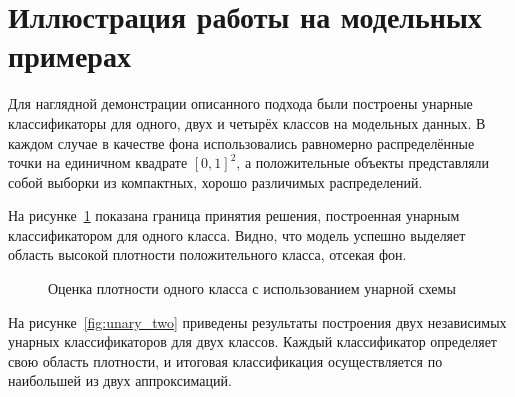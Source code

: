 \section{Иллюстрация работы на модельных примерах}

Для наглядной демонстрации описанного подхода были построены унарные классификаторы для одного, двух и четырёх классов на модельных данных. В каждом случае в качестве фона использовались равномерно распределённые точки на единичном квадрате \([0, 1]^2\), а положительные объекты представляли собой выборки из компактных, хорошо различимых распределений.

На рисунке~\cref{fig:unary_one} показана граница принятия решения, построенная унарным классификатором для одного класса. Видно, что модель успешно выделяет область высокой плотности положительного класса, отсекая фон.

\begin{figure}[ht]
    \caption{Оценка плотности одного класса с использованием унарной схемы}
    \label{fig:unary_one}
\end{figure}

На рисунке~\cref{fig:unary_two} приведены результаты построения двух независимых унарных классификаторов для двух классов. Каждый классификатор определяет свою область плотности, и итоговая классификация осуществляется по наибольшей из двух аппроксимаций.

